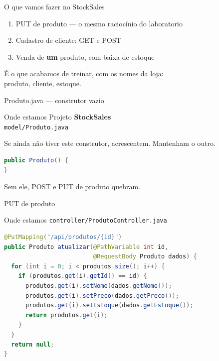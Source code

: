\documentclass[aspectratio=169,11pt]{beamer}
\newcommand{\onde}[1]{%
  \begin{block}{Onde estamos}
    #1
  \end{block}
}
\begin{document}
\begin{frame}{O que vamos fazer no StockSales}
  \begin{enumerate}
    \item PUT de produto --- o mesmo raciocínio do laboratorio
    \item Cadastro de cliente: GET e POST
    \item Venda de \textbf{um} produto, com baixa de estoque
  \end{enumerate}

  \vspace{0.5em}
  É o que acabamos de treinar, com os nomes da loja:\\
  produto, cliente, estoque.
\end{frame}

\begin{frame}[fragile]{Produto.java --- construtor vazio}
  \onde{Projeto \textbf{StockSales}\\
        \texttt{model/Produto.java}}

  Se ainda não tiver este construtor, acrescentem.
  Mantenham o outro.

\begin{lstlisting}[language=Java,basicstyle=\ttfamily\footnotesize]
public Produto() {
}
\end{lstlisting}

  Sem ele, POST e PUT de produto quebram.
\end{frame}

\begin{frame}[fragile]{PUT de produto}
  \onde{\texttt{controller/ProdutoController.java}}

\begin{lstlisting}[language=Java,basicstyle=\ttfamily\footnotesize]
@PutMapping("/api/produtos/{id}")
public Produto atualizar(@PathVariable int id,
                         @RequestBody Produto dados) {
  for (int i = 0; i < produtos.size(); i++) {
    if (produtos.get(i).getId() == id) {
      produtos.get(i).setNome(dados.getNome());
      produtos.get(i).setPreco(dados.getPreco());
      produtos.get(i).setEstoque(dados.getEstoque());
      return produtos.get(i);
    }
  }
  return null;
}
\end{lstlisting}
\end{frame}
\end{document}
